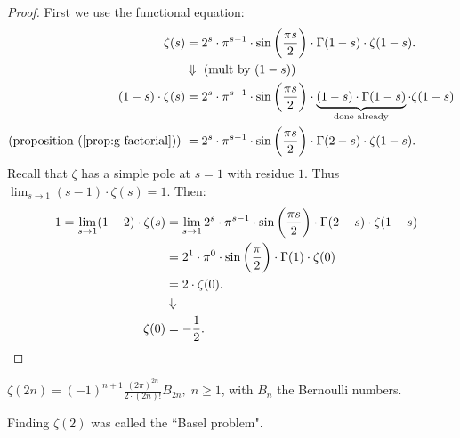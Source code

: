 \begin{proof}
First we use the functional equation:
\begin{align*}
    \zeta(s) &= 2^s \cdot \pi^{s-1} \cdot \sin\left( \frac{\pi s}{2} \right) \cdot \Gamma(1-s) \cdot \zeta(1-s).\\
    &\Downarrow \text{ (mult by $(1-s)$)}\\
    (1-s)\cdot \zeta(s) &= 2^s \cdot \pi^{s-1} \cdot \sin\left( \frac{\pi s}{2} \right) \cdot \underbrace{(1-s)\cdot \Gamma(1-s)}_{\text{done already}} \cdot \zeta(1-s)\\
    \text{(proposition (\ref{prop:g-factorial})) } &= 2^s \cdot \pi^{s-1} \cdot \sin\left( \frac{\pi s}{2} \right) \cdot \Gamma(2-s) \cdot \zeta(1-s).
\end{align*}
Recall that $\zeta$ has a simple pole at $s=1$ with residue $1$. Thus $\lim_{s\to 1} (s-1)\cdot \zeta(s) = 1$. Then:
\begin{align*}
    -1 = \lim_{s\to 1} (1-2)\cdot \zeta(s) &= \lim_{s\to 1} 2^s \cdot \pi^{s-1} \cdot \sin\left( \frac{\pi s}{2} \right) \cdot \Gamma(2-s) \cdot \zeta(1-s)\\
    & = 2^1 \cdot \pi^0 \cdot \sin\left( \frac{\pi}{2} \right) \cdot \Gamma(1) \cdot \zeta(0)\\
    &= 2 \cdot  \zeta(0).\\
    &\Downarrow\\
    \zeta(0) &= - \frac{1}{2}.
\end{align*}
\end{proof}

\begin{corollary}\label{cor:z-even}
$\zeta(2n) =(-1)^{n+1} \frac{(2\pi)^{2n}}{2 \cdot (2n)!} B_{2n}, \; n \geq 1$, with $B_n$ the Bernoulli numbers.
\end{corollary}

\begin{note}
Finding $\zeta(2)$ was called the ``Basel problem".
\end{note}

